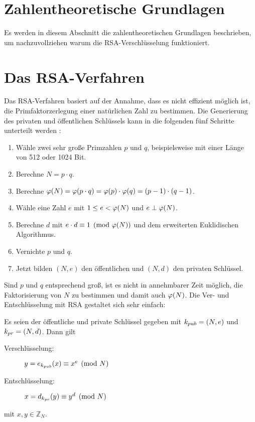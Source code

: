 \section{Zahlentheoretische Grundlagen}
Es werden in diesem Abschnitt die zahlentheoretischen Grundlagen beschrieben,
um nachzuvollziehen warum die RSA-Verschlüsselung funktioniert.







\section{Das RSA-Verfahren}
Das RSA-Verfahren basiert auf der Annahme, dass es nicht effizient
möglich ist, die Primfaktorzerlegung einer natürlichen Zahl zu bestimmen.
Die Generierung des privaten und öffentlichen Schlüssels kann in die
folgenden fünf Schritte unterteilt werden \parencite[176]{BOOK:crypto}:

\begin{definition}\mbox{}
  \begin{enumerate}
    \item Wähle zwei sehr große Primzahlen $p$ und $q$, beispielsweise mit einer
          Länge von 512 oder 1024 Bit.
    \item Berechne $N = p \cdot q$.
    \item Berechne $\varphi(N) = \varphi(p \cdot q) = \varphi(p) \cdot \varphi(q) = (p-1) \cdot (q-1)$.
    \item Wähle eine Zahl $e$ mit $1 \leq e < \varphi(N)$ und $e \perp \varphi(N)$.
    \item Berechne $d$ mit $e \cdot d \equiv 1 \pmod{\varphi(N)}$ und dem erweiterten
          Euklidischen Algorithmus.
    \item Vernichte $p$ und $q$.
    \item Jetzt bilden $(N,e)$ den öffentlichen und $(N,d)$ den privaten Schlüssel.
  \end{enumerate}
\end{definition}

\noindent
Sind $p$ und $q$ entsprechend groß, ist es nicht in annehmbarer Zeit möglich, die Faktorisierung
von $N$ zu bestimmen und damit auch $\varphi(N)$. Die Ver- und Entschlüsselung mit RSA
gestaltet sich sehr einfach:

\begin{definition}
  Es seien der öffentliche und private Schlüssel gegeben mit
  $k_{pub} = (N,e)$ und $k_{pr} = (N,d)$. Dann gilt
  \begin{description}
    \item[Verschlüsselung:] $y = e_{k_{pub}}(x) \equiv x^e \pmod{N}$
    \item[Entschlüsselung:] $x = d_{k_{pr}}(y) \equiv y^d \pmod{N}$
  \end{description}
  mit $x,y \in \mathbb{Z}_N$.
\end{definition}

